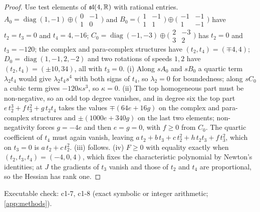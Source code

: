 \begin{proof}
Use test elements of $\mathfrak{sl}(4,\mathbb{R})$ with rational entries. $A_0=\operatorname{diag}(1,-1)\oplus\bigl(\begin{smallmatrix}0&-1\\1&0\end{smallmatrix}\bigr)$ and
$B_0=\bigl(\begin{smallmatrix}1&-1\\1&1\end{smallmatrix}\bigr)\oplus\bigl(\begin{smallmatrix}-1&-1\\1&-1\end{smallmatrix}\bigr)$ have $t_2=t_3=0$ and $t_4=4,-16$;
$C_0=\operatorname{diag}(-1,-3)\oplus\bigl(\begin{smallmatrix}2&-3\\3&2\end{smallmatrix}\bigr)$ has $t_2=0$ and $t_3=-120$; the complex and para-complex structures have
$(t_2,t_4)=(\mp4,4)$; $D_0=\operatorname{diag}(1,-1,2,-2)$ and two rotations of speeds $1,2$ have $(t_2,t_4)=(\pm10,34)$, all with $t_3=0$. (i) Along $sA_0$ and $sB_0$ a quartic
term $\lambda_2t_4$ would give $\lambda_2t_4s^4$ with both signs of $t_4$, so $\lambda_2=0$ for boundedness; along $sC_0$ a cubic term gives $-120\kappa s^3$, so $\kappa=0$. (ii) The top
homogeneous part must be non-negative, so an odd top degree vanishes, and in degree six the top part $e\,t_2^3+f\,t_3^2+g\,t_2t_4$ takes the values $\mp(64e+16g)$ on the
complex and para-complex structures and $\pm(1000e+340g)$ on the last two elements; non-negativity forces $g=-4e$ and then $e=g=0$, with $f\ge0$ from $C_0$. The quartic
coefficient of $t_4$ must again vanish, leaving $a\,t_2+b\,t_3+c\,t_2^2+h\,t_2t_3+f\,t_3^2$, which on $t_3=0$ is $a\,t_2+c\,t_2^2$. (iii) follows. (iv) $F\ge0$ with equality exactly
when $(t_2,t_3,t_4)=(-4,0,4)$, which fixes the characteristic polynomial by Newton's identities; at $J$ the gradients of $t_3$ vanish and those of $t_2$ and $t_4$ are
proportional, so the Hessian has rank one.
\end{proof}

\noindent Executable check: c1-7, c1-8 (exact symbolic or integer arithmetic; \cref{app:methods}).

